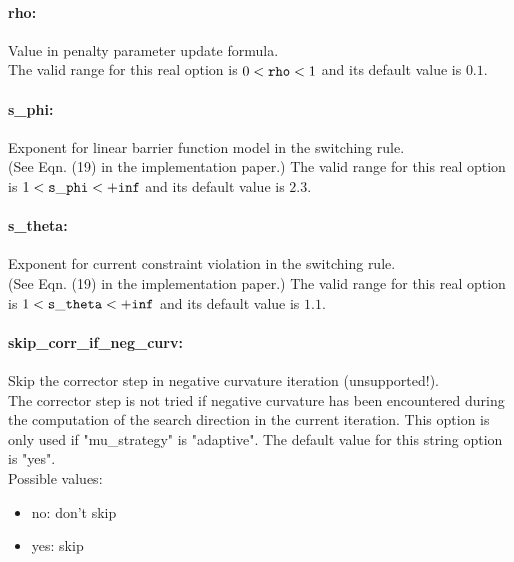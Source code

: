 \paragraph{rho:}\label{sec:rho} Value in penalty parameter update formula. $\;$ \\
 The valid range for this real option is 
$0 <  {\tt rho } <  1$
and its default value is $0.1$.


\paragraph{s\_phi:}\label{sec:s_phi} Exponent for linear barrier function model in the switching rule. $\;$ \\
 (See Eqn. (19) in the implementation paper.) The valid range for this real option is 
$1 <  {\tt s\_phi } <  {\tt +inf}$
and its default value is $2.3$.


\paragraph{s\_theta:}\label{sec:s_theta} Exponent for current constraint violation in the switching rule. $\;$ \\
 (See Eqn. (19) in the implementation paper.) The valid range for this real option is 
$1 <  {\tt s\_theta } <  {\tt +inf}$
and its default value is $1.1$.


\paragraph{skip\_corr\_if\_neg\_curv:}\label{sec:skip_corr_if_neg_curv} Skip the corrector step in negative curvature iteration (unsupported!). $\;$ \\
 The corrector step is not tried if negative
curvature has been encountered during the
computation of the search direction in the
current iteration. This option is only used if
"mu\_strategy" is "adaptive".
The default value for this string option is "yes".
\\ 
Possible values:
\begin{itemize}
   \item no: don't skip
   \item yes: skip
\end{itemize}


